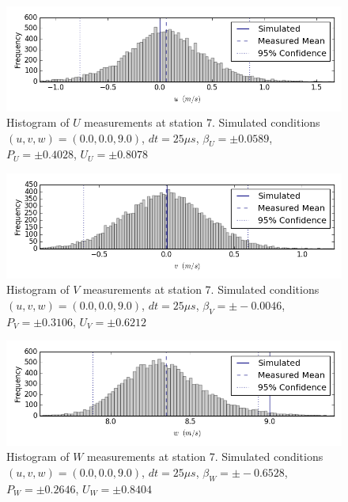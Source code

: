 \begin{figure}[H]
\centering
\includegraphics[width=6in]{figs/Ely_May28th07003/uncertainty_Ely_May28th07003_U}
\caption{Histogram of $U$ measurements at station 7. Simulated conditions $(u,v,w)=(0.0, 0.0, 9.0)$, $dt=25 \mu s$, $\beta_U=\pm 0.0589$, $P_U=\pm 0.4028$, $U_U=\pm 0.8078$}
\label{fig:uncertainty_Ely_May28th07003_U}
\end{figure}


\begin{figure}[H]
\centering
\includegraphics[width=6in]{figs/Ely_May28th07003/uncertainty_Ely_May28th07003_V}
\caption{Histogram of $V$ measurements at station 7. Simulated conditions $(u,v,w)=(0.0, 0.0, 9.0)$, $dt=25 \mu s$, $\beta_V=\pm -0.0046$, $P_V=\pm 0.3106$, $U_V=\pm 0.6212$}
\label{fig:uncertainty_Ely_May28th07003_V}
\end{figure}


\begin{figure}[H]
\centering
\includegraphics[width=6in]{figs/Ely_May28th07003/uncertainty_Ely_May28th07003_W}
\caption{Histogram of $W$ measurements at station 7. Simulated conditions $(u,v,w)=(0.0, 0.0, 9.0)$, $dt=25 \mu s$, $\beta_W=\pm -0.6528$, $P_W=\pm 0.2646$, $U_W=\pm 0.8404$}
\label{fig:uncertainty_Ely_May28th07003_W}
\end{figure}


